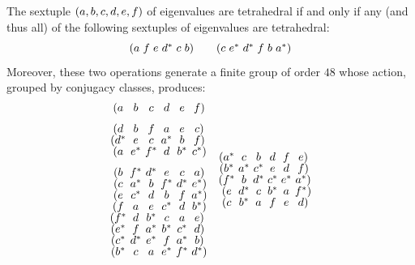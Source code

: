 \documentclass[notitlepage, 10pt]{article}
\begin{document}
\begin{prop}
    \label{prop:tet_symmetry}
    The sextuple $(a,b,c,d,e,f)$ of eigenvalues are tetrahedral if and only if any (and thus all) of the following sextuples of eigenvalues are tetrahedral:
    \begin{equation}
        \label{eq:gens_of_tet_sym}
        \tightsextuple{(
            \ea & \ef  & \ee  & \ed^{*}  & \ec  & \eb
         )}
        \qquad
        \tightsextuple{(
            \ec  & \ee^*  & \ed^{*}  & \ef  & \eb  & \ea^*
        )}
    \end{equation}
    Moreover, these two operations generate a finite group of order $48$ whose action, grouped by conjugacy classes, produces:
    \begin{equation}
        \label{eq:all_of_tet_sym}
        \tightsextuple{
            (\ea  & \eb  & \ec  & \ed  & \ee  & \ef )\\[1em]
            (\ed  & \eb  & \ef  & \ea  & \ee  & \ec )\\
            (\ed^* & \ee  & \ec  & \ea^* & \eb  & \ef )\\
            (\ea  & \ee^* & \ef^* & \ed  & \eb^* & \ec^*)\\[1em]
            (\eb  & \ef^* & \ed^* & \ee  & \ec  & \ea )\\
            (\ec  & \ea^* & \eb  & \ef^* & \ed^* & \ee^*)\\
            (\ee  & \ec^* & \ed  & \eb  & \ef  & \ea^*)\\
            (\ef  & \ea  & \ee  & \ec^* & \ed  & \eb^*)\\
            (\ef^* & \ed  & \eb^* & \ec  & \ea  & \ee )\\
            (\ee^* & \ef  & \ea^* & \eb^* & \ec^* & \ed )\\
            (\ec^* & \ed^* & \ee^* & \ef  & \ea^* & \eb )\\
            (\eb^* & \ec  & \ea  & \ee^* & \ef^* & \ed^*)\\
        }
        \quad
        \tightsextuple{
            (\ea ^* & \ec  & \eb  & \ed  & \ef  & \ee )\\
            (\eb ^* & \ea ^* & \ec ^* & \ee  & \ed  & \ef )\\
            (\ef ^* & \eb  & \ed ^* & \ec ^* & \ee ^* & \ea ^*)\\
            (\ee  & \ed ^* & \ec  & \eb ^* & \ea  & \ef ^*)\\
            (\ec  & \eb ^* & \ea  & \ef  & \ee  & \ed )\\
}
\end{equation}
\end{prop}
\end{document}
